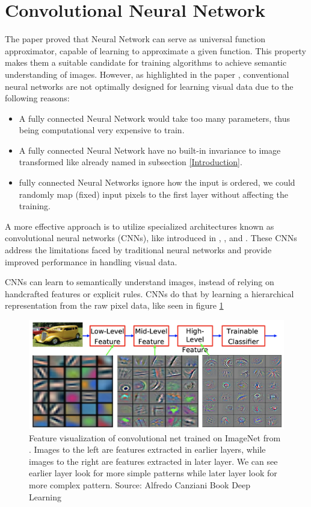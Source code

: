 \section{Convolutional Neural Network} \label{CNN}

The paper \citep{HORNIK1989359} proved that Neural Network can serve as universal function approximator, capable of learning to approximate a given function.
This property makes them a suitable candidate for training algorithms to achieve semantic understanding of images.
However, as highlighted in the paper \citep{CNNLeCunDocumentRecog}, conventional neural networks are not optimally designed for learning visual data due to the following reasons:
\begin{itemize}
    \item A fully connected Neural Network would take too many parameters, thus being computational very expensive to train.
    \item A fully connected Neural Network have no built-in invariance to image transformed like already named in subsection \ref{Introduction}.
    \item fully connected Neural Networks ignore how the input is ordered, we could randomly map (fixed) input pixels to the first layer without affecting the training.
\end{itemize}
A more effective approach is to utilize specialized architectures known as convolutional neural networks (CNNs), like introduced in \citep{rumelhart1985learning}, \citep{CNNLeCunHandwrittenDigits}, \citep{CNNLeCunDocumentRecog} and \citep{NIPS2012_c399862d}. These CNNs address the limitations faced by traditional neural networks and provide improved performance in handling visual data.

CNNs can learn to semantically understand images, instead of relying on handcrafted features or explicit rules.
CNNs do that by learning a hierarchical representation from the raw pixel data, like seen in figure \ref{fig:cnn_features}

\begin{figure}[h]
    \centering
    \includegraphics[width=1\textwidth]{figures/cnn_features.png}
    \caption{Feature visualization of convolutional net trained on ImageNet from \citep{zeiler2014visualizing}.
    Images to the left are features extracted in earlier layers, while images to the right are features extracted in later layer.
    We can see earlier layer look for more simple patterns while later layer look for more complex pattern.
    Source: Alfredo Canziani Book Deep Learning}
    \label{fig:cnn_features}
\end{figure}

